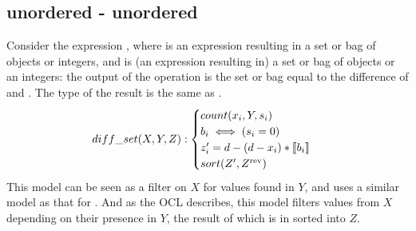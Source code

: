 

\newpage\subsection{unordered - unordered}
Consider the expression , where  is an expression resulting in a set or bag of objects or integers, and  is (an expression resulting in) a set or bag of objects or an integers: the output of the operation is the set or bag equal to the difference of  and .
The type of the result is the same as .
\begin{equation}\label{csp:diff_set}
    diff\_set(X,Y,Z):
    \begin{cases}
        count(x_i,Y,s_i)\\
        b_i \iff (s_i = 0)\\
        z'_i = d - (d-x_i)*\llbracket b_i \rrbracket\\
        sort(Z',Z^{\text{rev}})
    \end{cases}
\end{equation}
This model can be seen as a filter on $X$ for values found in $Y$, and uses a similar model as that for .
And as the OCL describes, this model filters values from $X$ depending on their presence in $Y$, the result of which is in sorted into $Z$.


